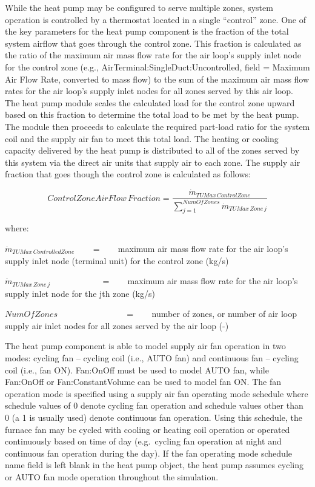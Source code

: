 While the heat pump may be configured to serve multiple zones, system operation is controlled by a thermostat located in a single ``control'' zone. One of the key parameters for the heat pump component is the fraction of the total system airflow that goes through the control zone. This fraction is calculated as the ratio of the maximum air mass flow rate for the air loop's supply inlet node for the control zone (e.g., AirTerminal:SingleDuct:Uncontrolled, field = Maximum Air Flow Rate, converted to mass flow) to the sum of the maximum air mass flow rates for the air loop's supply inlet nodes for all zones served by this air loop. The heat pump module scales the calculated load for the control zone upward based on this fraction to determine the total load to be met by the heat pump. The module then proceeds to calculate the required part-load ratio for the system coil and the supply air fan to meet this total load. The heating or cooling capacity delivered by the heat pump is distributed to all of the zones served by this system via the direct air units that supply air to each zone. The supply air fraction that goes though the control zone is calculated as follows:

\begin{equation}
Control Zone Air Flow\,Fraction = \frac{{{{\dot m}_{TUMax\,ControlZone}}}}{{\sum\limits_{j = 1}^{NumOfZones} {{{\dot m}_{TUMax\,Zone\,j}}} }}
\end{equation}

where:

\({\dot m_{TUMax\,ControlledZone}}\) ~~~ = ~~~ maximum air mass flow rate for the air loop's supply inlet node (terminal unit) for the control zone (kg/s)

\({\dot m_{TUMax\,Zone\,j}}\) ~~~~~~~~~~~ = ~~~ maximum air mass flow rate for the air loop's supply inlet node for the jth zone (kg/s)

\(NumOfZones\) ~~~~~~~~~~~~~~~ = ~~~ number of zones, or number of air loop supply air inlet nodes for all zones served by the air loop (-)

The heat pump component is able to model supply air fan operation in two modes: cycling fan -- cycling coil (i.e., AUTO fan) and continuous fan -- cycling coil (i.e., fan ON). Fan:OnOff must be used to model AUTO fan, while Fan:OnOff or Fan:ConstantVolume can be used to model fan ON. The fan operation mode is specified using a supply air fan operating mode schedule where schedule values of 0 denote cycling fan operation and schedule values other than 0 (a 1 is usually used) denote continuous fan operation. Using this schedule, the furnace fan may be cycled with cooling or heating coil operation or operated continuously based on time of day (e.g.~cycling fan operation at night and continuous fan operation during the day). If the fan operating mode schedule name field is left blank in the heat pump object, the heat pump assumes cycling or AUTO fan mode operation throughout the simulation.

